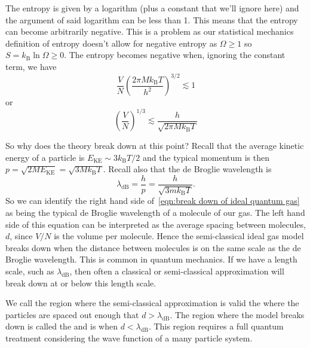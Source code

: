 \documentclass[a4paper]{article}
\newcommand{\boltzmann}{k_\mathrm{B}}
\begin{document}
    The entropy is given by a logarithm (plus a constant that we'll ignore here) and the argument of said logarithm can be less than 1.
    This means that the entropy can become arbitrarily negative.
    This is a problem as our statistical mechanics definition of entropy doesn't allow for negative entropy as \(\Omega \ge 1\) so \(S = \boltzmann \ln\Omega \ge 0\).
    The entropy becomes negative when, ignoring the constant term, we have
    \[\frac{V}{N}\left( \frac{2\pi M\boltzmann T}{h^2} \right)^{3/2} \lesssim 1\]
    or
    \begin{equation}\label{eqn:break down of ideal quantum gas}
        \left( \frac{V}{N} \right)^{1/3} \lesssim \frac{h}{\sqrt{2\pi M\boltzmann T}}
    \end{equation}
    
    So why does the theory break down at this point?
    Recall that the average kinetic energy of a particle is \(E_{\mathrm{KE}}\sim 3\boltzmann T/2\) and the typical momentum is then \(p = \sqrt{2ME_{\mathrm{KE}}} = \sqrt{3M\boltzmann T}\).
    Recall also that the de Broglie wavelength is
    \[\lambda_{\mathrm{dB}} = \frac{h}{p} = \frac{h}{\sqrt{3m\boltzmann T}}.\]
    So we can identify the right hand side of~\ref{eqn:break down of ideal quantum gas} as being the typical de Broglie wavelength of a molecule of our gas.
    The left hand side of this equation can be interpreted as the average spacing between molecules, \(d\), since \(V/N\) is the volume per molecule.
    Hence the semi-classical ideal gas model breaks down when the distance between molecules is on the same scale as the de Broglie wavelength.
    This is common in quantum mechanics.
    If we have a length scale, such as \(\lambda_{\mathrm{dB}}\), then often a classical or semi-classical approximation will break down at or below this length scale.
    
    We call the region where the semi-classical approximation is valid the  where the particles are spaced out enough that \(d > \lambda_{\mathrm{dB}}\).
    The region where the model breaks down is called the  and is when \(d < \lambda_{\mathrm{dB}}\).
    This region requires a full quantum treatment considering the wave function of a many particle system.
\end{document}
